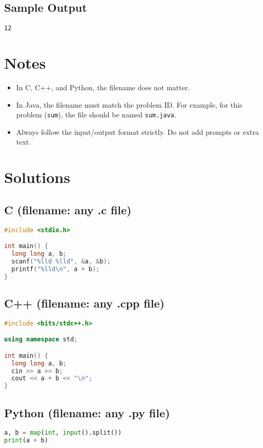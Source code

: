 \documentclass[12pt,a4paper]{article}
\begin{document}
\subsection*{Sample Output}
\begin{verbatim}
12
\end{verbatim}

\section*{Notes}
\begin{itemize}
    \item In C, C++, and Python, the filename does not matter.  
    \item In Java, the filename must match the problem ID.  
For example, for this problem (\texttt{sum}), the file should be named \texttt{sum.java}.  
    \item Always follow the input/output format strictly. Do not add prompts or extra text.  
\end{itemize}

\section*{Solutions}

\subsection*{C (filename: any .c file)}
\begin{lstlisting}[language=C]
#include <stdio.h>

int main() {
  long long a, b;
  scanf("%lld %lld", &a, &b);
  printf("%lld\n", a + b);
}
\end{lstlisting}

\subsection*{C++ (filename: any .cpp file)}
\begin{lstlisting}[language=C++]
#include <bits/stdc++.h>

using namespace std;

int main() {
  long long a, b;
  cin >> a >> b;
  cout << a + b << "\n";
}
\end{lstlisting}

\subsection*{Python (filename: any .py file)}
\begin{lstlisting}[language=Python]
a, b = map(int, input().split())
print(a + b)
\end{lstlisting}
\end{document}
